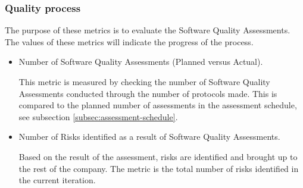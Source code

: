 \subsubsection{Quality process}
The purpose of these metrics is to evaluate the Software Quality Assessments. The values of these metrics will indicate the progress of the process.

\begin{itemize}    
    \item Number of Software Quality Assessments (Planned versus Actual).
    
    This metric is measured by checking the number of Software Quality Assessments conducted through the number of protocols made. This is compared to the planned number of assessments in the assessment schedule, see subsection \ref{subsec:assessment-schedule}. 
     
    \item Number of Risks identified as a result of Software Quality Assessments.
    
    Based on the result of the assessment, risks are identified and brought up to the rest of the company. The metric is the total number of risks identified in the current iteration.
\end{itemize}
